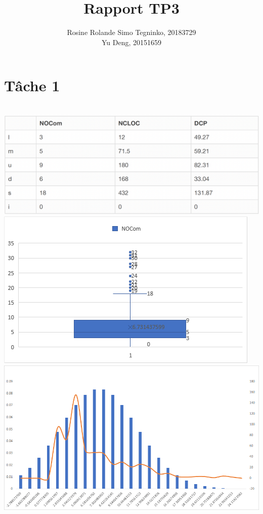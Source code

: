 \documentclass{article}
\title{Rapport TP3}
\author{Rosine Rolande Simo Tegninko, 20183729\\
Yu Deng, 20151659}
\date{}
\begin{document}
\maketitle

\section*{Tâche 1}\\
\includegraphics[scale=0.35]{T1_1.png}\\
\includegraphics[scale=0.5]{NOCom.png}\\
\includegraphics[scale=0.35]{T1_2.png}\\
\end{document}
